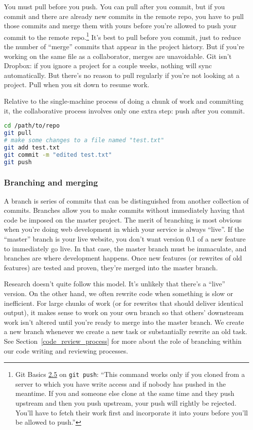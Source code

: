 You must pull before you push.
You can pull after you commit, but if you commit and there are already new commits in the remote repo, you have to pull those commits and merge them with yours before you're allowed to push your commit to the remote repo.\footnote{
	Git Basics \href{https://git-scm.com/book/en/v2/Git-Basics-Working-with-Remotes\#_pushing_remotes}{2.5} on \texttt{git push}: ``This command works only if you cloned from a server to which you have write access and if nobody has pushed in the meantime. If you and someone else clone at the same time and they push upstream and then you push upstream, your push will rightly be rejected. You'll have to fetch their work first and incorporate it into yours before you'll be allowed to push.''
}
It's best to pull before you commit, just to reduce the number of ``merge'' commits that appear in the project history.
But if you're working on the same file as a collaborator, merges are unavoidable.
Git isn't Dropbox: if you ignore a project for a couple weeks, nothing will sync automatically.
But there's no reason to pull regularly if you're not looking at a project.
Pull when you sit down to resume work.

Relative to the single-machine process of doing a chunk of work and committing it,
the collaborative process involves only one extra step:
push after you commit.
\begin{lstlisting}[language=bash]
cd /path/to/repo
git pull
# make some changes to a file named "test.txt"
git add test.txt
git commit -m "edited test.txt"
git push
\end{lstlisting}


\subsubsection{Branching and merging}
A branch is series of commits that can be distinguished from another collection of commits.
Branches allow you to make commits without immediately having that code be imposed on the master project.
The merit of branching is most obvious when you're doing web development in which your service is always ``live''.
If the ``master'' branch is your live website, you don't want version 0.1 of a new feature to immediately go live.
In that case, the master branch must be immaculate, and branches are where development happens.
Once new features (or rewrites of old features) are tested and proven, they're merged into the master branch.

Research doesn't quite follow this model.
It's unlikely that there's a ``live'' version.
On the other hand, we often rewrite code when something is slow or inefficient.
For large chunks of work (or for rewrites that should deliver identical output), it makes sense to work on your own branch so that others' downstream work isn't altered until you're ready to merge into the master branch.
We create a new branch whenever we create a new task or substantially rewrite an old task.
See Section~\ref{code_review_process} for more about the role of branching within our code writing and reviewing processes.

